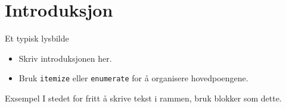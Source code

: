 \documentclass[aspectratio=169]{beamer}
\begin{document}
	\section{Introduksjon}
	
	\begin{frame}{Et typisk lysbilde}
		
		
		\begin{itemize}
			\item Skriv introduksjonen her.
			\item Bruk \texttt{itemize} eller \texttt{enumerate} for å organisere hovedpoengene.
		\end{itemize}
		
		\vskip 1cm
		
		\begin{block}{Exsempel}
			I stedet for fritt å skrive tekst i rammen, bruk blokker som dette.
		\end{block}
		
	\end{frame}
	
	
\end{document}
